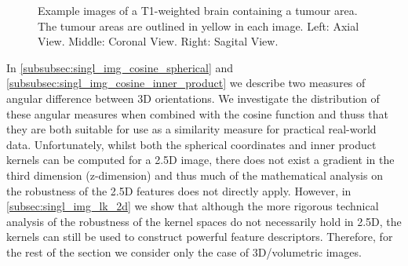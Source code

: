 \begin{figure}
\begin{subfigure}{0.32\columnwidth}
    \end{subfigure}
    \caption{Example images of a T1-weighted brain containing a tumour area. 
             The tumour areas are outlined in yellow in each image.
             Left: Axial View. Middle: Coronal View. Right: Sagital View.}
\label{fig:singl_img_tumour_examples}
\end{figure}

In \cref{subsubsec:singl_img_cosine_spherical} and
\cref{subsubsec:singl_img_cosine_inner_product} we describe two measures of angular
difference between 3D orientations. We investigate the distribution of these
angular measures when combined with the cosine function and thuss that they
are both suitable for use as a similarity measure for practical real-world data.
Unfortunately, whilst both the spherical coordinates and inner product kernels
can be computed for a 2.5D image,
there does not exist a gradient in the third dimension (z-dimension) and thus
much of the mathematical analysis on the robustness of the 2.5D features does 
not directly apply. However, in 
\cref{subsec:singl_img_lk_2d} we show that although the more rigorous technical
analysis of the robustness of the kernel spaces do not necessarily
hold in 2.5D, the kernels can still be used to construct
powerful feature descriptors. Therefore, for the rest of the section we consider
only the case of 3D/volumetric images.
